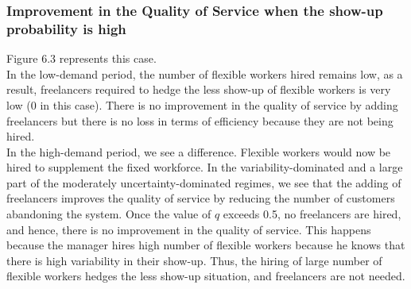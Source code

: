 \subsubsection{Improvement in the Quality of Service when the show-up probability is high}
Figure 6.3 represents this case. \\ In the low-demand period, the number of flexible workers hired remains low, as a result, freelancers required to hedge the less show-up of flexible workers is very low (0 in this case). There is no improvement in the quality of service by adding freelancers but there is no loss in terms of efficiency because they are not being hired.\\ In the high-demand period, we see a difference. Flexible workers would now be hired to supplement the fixed workforce. In the variability-dominated and a large part of the moderately uncertainty-dominated regimes, we see that the adding of freelancers improves the quality of service by reducing the number of customers abandoning the system. Once the value of $q$ exceeds 0.5, no freelancers are hired, and hence, there is no improvement in the quality of service. This happens because the manager hires high number of flexible workers because he knows that there is high variability in their show-up. Thus, the hiring of large number of flexible workers hedges the less show-up situation, and freelancers are not needed.
